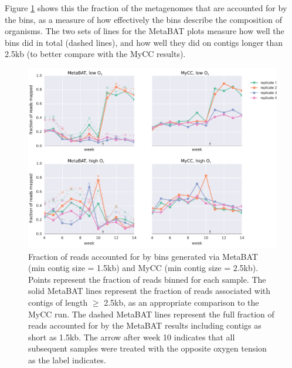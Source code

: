 Figure \ref{fig:binning_frac_reads_mapped} shows this the fraction of the metagenomes that are accounted for by the bins, as a measure of how effectively the bins describe the composition of organisms.
The two sets of lines for the MetaBAT plots measure how well the bins did in total (dashed lines), and how well they did on contigs longer than 2.5kb (to better compare with the MyCC results).


\begin{figure}[H]
\centering
    \includegraphics[width=1.0\textwidth]{./tex/chapter2/figures/170201_comparable_read_coverage_for_metabat_and_mycc_3kb--INKSCAPED.pdf}
    \begin{singlespace}
    \caption[Fraction of reads accounted for by MetaBAT and MyCC bins]{
        Fraction of reads accounted for by bins generated via MetaBAT (min contig size = 1.5kb) and MyCC (min contig size = 2.5kb).
        Points represent the fraction of reads binned for each sample.
        The solid MetaBAT lines represent the fraction of reads associated with contigs of length $\geq$ 2.5kb, as an appropriate comparison to the MyCC run.
        The dashed MetaBAT lines represent the full fraction of reads accounted for by the MetaBAT results including contigs as short as 1.5kb.
        The arrow after week 10 indicates that all subsequent samples were treated with the opposite oxygen tension as the label indicates.
    }
    \label{fig:binning_frac_reads_mapped}
    \end{singlespace}
\end{figure}

